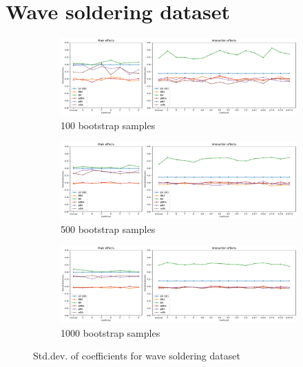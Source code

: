 \documentclass{article}
\begin{document}
\section{Wave soldering dataset}
\begin{figure}
    \centering
    \begin{subfigure}[c]{\textwidth}
        \includegraphics[width=\linewidth]{figures/wavesoldering-std.pdf}
        \caption{100 bootstrap samples}
        \label{fig:wavesoldering-std-100}
    \end{subfigure}
    \begin{subfigure}[c]{\textwidth}
        \includegraphics[width=\linewidth]{figures/wavesoldering-std-500.pdf}
        \caption{500 bootstrap samples}
        \label{fig:wavesoldering-std-500}
    \end{subfigure}
    \begin{subfigure}[c]{\textwidth}
        \includegraphics[width=\linewidth]{figures/wavesoldering-std-1000.pdf}
        \caption{1000 bootstrap samples}
        \label{fig:wavesoldering-std-1000}
    \end{subfigure}
    \caption{Std.dev. of coefficients for wave soldering dataset}
    \label{fig:wavesoldering-std}
\end{figure}
\end{document}
